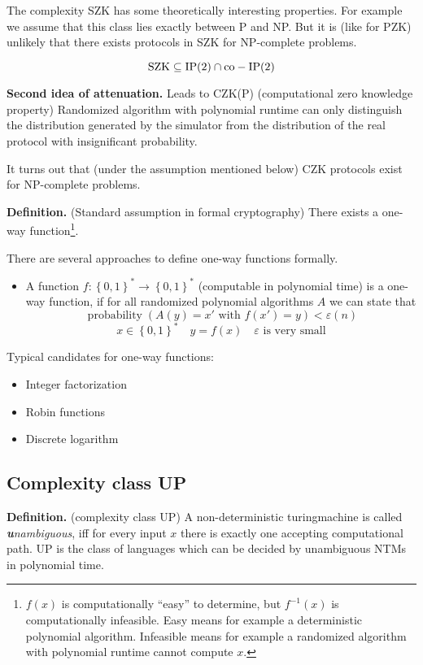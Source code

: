 \documentclass[a4paper]{article}
\newcommand{\cls}[1]{\rm{#1}}
\newcommand{\set}[1]{\left\{#1\right\}}
\DeclareMathOperator{\prop}{probability}
\begin{document}
The complexity SZK has some theoretically interesting properties. For example
we assume that this class lies exactly between P and \cls{NP}. But it is (like for
PZK) unlikely that there exists protocols in SZK for \cls{NP}-complete problems.

\[
  \cls{SZK} \subseteq \cls{IP(2)} \cap \cls{co-IP(2)}
\]

\textbf{Second idea of attenuation.}
  Leads to \cls{CZK(P)} (computational zero knowledge property)
  Randomized algorithm with polynomial runtime can only distinguish the
  distribution generated by the simulator from the distribution of the
  real protocol with insignificant probability.

  It turns out that (under the assumption mentioned below) \cls{CZK}
  protocols exist for \cls{NP}-complete problems.

\textbf{Definition.} (Standard assumption in formal cryptography)
  There exists a one-way function\footnote{$f(x)$ is computationally
  ``easy'' to determine, but $f^{-1}(x)$ is computationally infeasible.
  Easy means for example a deterministic polynomial algorithm.
  Infeasible means for example a randomized algorithm with polynomial
  runtime cannot compute $x$.}.

There are several approaches to define one-way functions formally.
\begin{itemize}
  \item
    A function $f: \set{0,1}^* \rightarrow \set{0,1}^*$ (computable
    in polynomial time) is a one-way function, if for all randomized
    polynomial algorithms $A$ we can state that
    \[
      \prop(A(y) = x' \text{ with } f(x') = y)
      < \varepsilon(n)
    \] \[
      x \in \set{0,1}^* \quad
      y = f(x) \quad
      \varepsilon \text{ is very small}
    \]
\end{itemize}

Typical candidates for one-way functions:
\begin{itemize}
  \item Integer factorization
  \item Robin functions
  \item Discrete logarithm
\end{itemize}

\subsection{Complexity class UP}
\label{class:up}
%
\textbf{Definition.} (complexity class \cls{UP})
A non-deterministic turingmachine is called \emph{\textbf{u}nambiguous}, iff
for every input $x$ there is exactly one accepting
computational path. UP is the class of languages which can be decided
by unambiguous NTMs in polynomial time.
\end{document}
